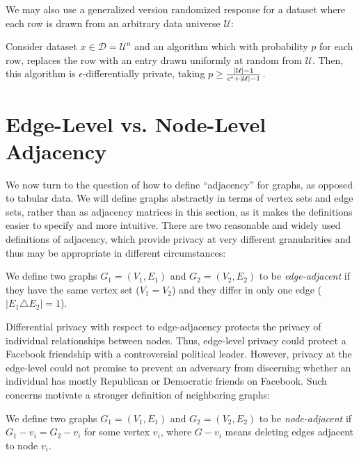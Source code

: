  We may also use a generalized version randomized response for a dataset where each row is drawn from an arbitrary data universe $\mathcal{U}$:

\begin{theorem}
\label{thm:rr_gen} Consider dataset $x \in \mathcal{D} = \mathcal{U}^n$ and an algorithm which with probability $p$ for each row, replaces the row with an entry drawn uniformly at random from $\mathcal{U}$. Then, this algorithm is $\epsilon$-differentially private, taking $p \geq \frac{|\mathcal{U}| - 1}{e^{\epsilon} + |\mathcal{U}| - 1 }$.
\end{theorem}

\section{Edge-Level vs. Node-Level Adjacency}

We now turn to the question of how to define ``adjacency'' for graphs, as opposed to tabular data. We will define graphs abstractly in terms of vertex sets and edge sets, rather than as adjacency matrices in this section, as it makes the definitions easier to specify and more intuitive. There are two reasonable and widely used definitions of adjacency, which provide privacy at very different granularities and thus may be appropriate in different circumstances: 

\begin{definition}
\label{def:edge_level}
We define two graphs $G_1 = (V_1, E_1)$ and $G_2 = (V_2, E_2)$ to be \emph{edge-adjacent} if they have the same vertex set ($V_1 = V_2$) and they differ in only one edge ($\left| E_1 \triangle E_2   \right| = 1$). 
\end{definition}
Differential privacy with respect to edge-adjacency protects the privacy of individual relationships between nodes. Thus, edge-level privacy could protect a Facebook friendship with a controversial political leader. However, privacy at the edge-level could not promise to prevent an adversary from discerning whether an individual has mostly Republican or Democratic friends on Facebook. Such concerns motivate a stronger definition of neighboring graphs:

\begin{definition}
\label{def:node_level}
We define two graphs $G_1 = (V_1, E_1)$ and $G_2 = (V_2, E_2)$ to be \emph{node-adjacent} if $G_1-v_i = G_2-v_i$ for some vertex $v_i$, where $G-v_i$ means deleting edges adjacent to node $v_i$.
\end{definition}

